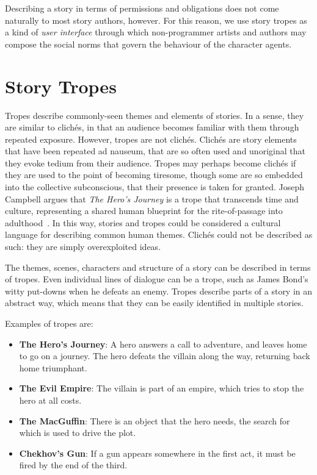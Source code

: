 \documentclass[11pt]{report}
\begin{document}
Describing a story in terms of permissions and obligations does not come
naturally to most story authors, however. For this reason, we use story tropes
as a kind of \emph{user interface} through which non-programmer artists and
authors may compose the social norms that govern the behaviour of the character agents.

\section{Story Tropes}
\label{sec:tropes-intro}


Tropes describe commonly-seen themes and elements of stories. In a sense, they are similar to clich\'es, in that an audience becomes familiar with them through repeated exposure. However, tropes are not clich\'es. Clich\'es are story elements that have been repeated ad nauseum, that are so often used and unoriginal that they evoke tedium from their audience. Tropes may perhaps become clich\'es if they are used to the point of becoming tiresome, though some are so embedded into the collective subconscious, that their presence is taken for granted. Joseph Campbell argues that \emph{The Hero's Journey} is a trope that transcends time and culture, representing a shared human blueprint for the rite-of-passage into adulthood~\citep{campbell2008hero}. In this way, stories and tropes could be considered a cultural language for describing common human themes. Clich\'es could not be described as such: they are simply overexploited ideas.

The themes, scenes, characters and structure of a story can be described in terms of tropes. Even individual lines of dialogue can be a trope, such as James Bond's witty put-downs when he defeats an enemy. Tropes describe parts of a story in an abstract way, which means that they can be easily identified in multiple stories.

Examples of tropes are:

\begin{itemize}
\item \textbf{The Hero's Journey}: A hero answers a call to adventure, and
  leaves home to go on a journey. The hero defeats the villain along the way, returning back home triumphant.
\item \textbf{The Evil Empire}: The villain is part of an empire, which tries to stop the hero at all costs.
\item \textbf{The MacGuffin}: There is an object that the hero needs, the search for which is used to drive the plot.
\item \textbf{Chekhov's Gun}: If a gun appears somewhere in the first act, it must be fired by the end of the third.
\end{itemize}
\end{document}
